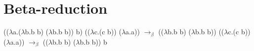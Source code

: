 \documentclass[16pt,a4paper]{scrartcl}
\begin{document}
\section{Beta-reduction}

(($\lambda$a.($\lambda$b.b b) ($\lambda$b.b b)) b) (($\lambda$c.(c b)) ($\lambda$a.a))
$\rightarrow_\beta$ (($\lambda$b.b b) ($\lambda$b.b b)) (($\lambda$c.(c b)) ($\lambda$a.a)) 
$\rightarrow_\beta$ (($\lambda$b.b b) ($\lambda$b.b b)) b
\end{document}
